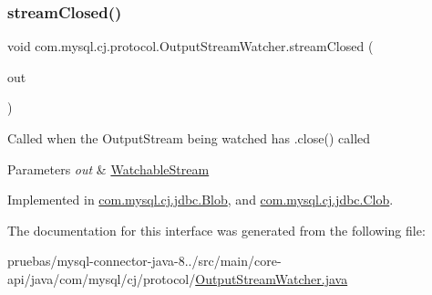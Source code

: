 \subsubsection{\texorpdfstring{stream\+Closed()}{streamClosed()}}
{\footnotesize\ttfamily void com.\+mysql.\+cj.\+protocol.\+Output\+Stream\+Watcher.\+stream\+Closed (\begin{DoxyParamCaption}\item[{\mbox{\hyperlink{interfacecom_1_1mysql_1_1cj_1_1protocol_1_1_watchable_stream}{Watchable\+Stream}}}]{out }\end{DoxyParamCaption})}

Called when the Output\+Stream being watched has .close() called


\begin{DoxyParams}{Parameters}
{\em out} & \mbox{\hyperlink{interfacecom_1_1mysql_1_1cj_1_1protocol_1_1_watchable_stream}{Watchable\+Stream}} \\
\hline
\end{DoxyParams}


Implemented in \mbox{\hyperlink{classcom_1_1mysql_1_1cj_1_1jdbc_1_1_blob_a891c76fb3123f5d9f736e05d50ed1fe8}{com.\+mysql.\+cj.\+jdbc.\+Blob}}, and \mbox{\hyperlink{classcom_1_1mysql_1_1cj_1_1jdbc_1_1_clob_afce3b43001378654ee8a1d99c8685eeb}{com.\+mysql.\+cj.\+jdbc.\+Clob}}.



The documentation for this interface was generated from the following file\+:\begin{DoxyCompactItemize}
\item 
pruebas/mysql-\/connector-\/java-\/8../src/main/core-\/api/java/com/mysql/cj/protocol/\mbox{\hyperlink{_output_stream_watcher_8java}{Output\+Stream\+Watcher.\+java}}\end{DoxyCompactItemize}
